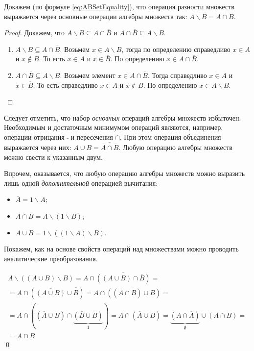 \begin{exampl}
    Докажем (по формуле \eqref{eq:ABSetEquality}), что операция разности множеств выражается через основные операции алгебры множеств так: $A\backslash B=A\cap\overline{B}$.
\end{exampl}
\begin{proof}
    Докажем, что $A\backslash B\subseteq A\cap\overline{B}$ и $A\cap\overline{B}\subseteq A\backslash B$.
    \begin{enumerate}
        \item $A\backslash B\subseteq A\cap\overline{B}$. Возьмем $x\in A\backslash B$, тогда по определению справедливо $x\in A$ и $x\not\in B$. То есть $x\in A$ и $x\in\overline{B}$. По определению $x\in A\cap\overline{B}$.
        \item $A\cap\overline{B}\subseteq A\backslash B$. Возьмем элемент $x\in A\cap\overline{B}$. Тогда справедливо $x\in A$ и $x\in\overline{B}$. То есть справедливо $x\in A$ и $x\not\in B$. По определению $x\in A\backslash B$.
    \end{enumerate}
\end{proof}

Следует отметить, что набор \emph{основных} операций алгебры множеств избыточен. Необходимым и достаточным минимумом операций являются, например, операции отрицания $\bar{~}$ и пересечения $\cap$. При этом операция объединения выражается через них: $A\cup B=\overline{\overline{A}\cap\overline{B}}$. Любую операцию алгебры множеств можно свести к указанным двум.

Впрочем, оказывается, что любую операцию алгебры множеств можно выразить лишь одной \emph{дополнительной} операцией вычитания:
\begin{itemize}
    \item $\overline{A}=1\backslash A$;
    \item $A\cap B=A\backslash (1\backslash B)$;
    \item $A\cup B=1\backslash((1\backslash A)\backslash B)$.    
\end{itemize}

Покажем, как на основе свойств операций над множествами можно проводить аналитические преобразования.
\begin{exampl}
\[
\begin{split}
A\backslash ((A\cup B)\backslash B) = A\cap\overline{((A\cup B)\cap\overline{B})}=\\
=A\cap(\overline{(A\cup B)}\cup\overline{\overline{B}})=A\cap((\overline{A}\cap\overline{B})\cup B)=\\
=A\cap((\overline{A}\cup B)\cap\underbrace{(\overline{B}\cup B)}_1)=A\cap (\overline{A}\cup B) = \underbrace{(A\cap\overline{A})}_\emptyset\cup(A\cap B)=\\
=A\cap B
\end{split}
\]
\qed
\end{exampl}

